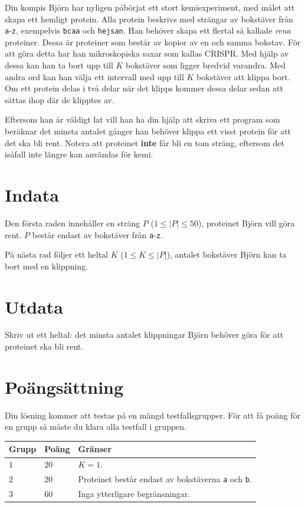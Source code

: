 \noindent

Din kompis Björn har nyligen påbörjat ett stort kemiexperiment, med målet att skapa
ett hemligt protein. Alla protein beskrivs med strängar av bokstäver från
\texttt{a}-\texttt{z}, exempelvis \texttt{bcaa} och \texttt{hejsan}. Han behöver skapa
ett flertal så kallade \textit{rena} proteiner. Dessa är proteiner som består av kopior
av en och samma bokstav. För att göra detta har han mikroskopiska saxar som kallas CRISPR.
Med hjälp av dessa kan han ta bort upp till $K$ bokstäver som ligger bredvid varandra.
Med andra ord kan han välja ett intervall med upp till $K$ bokstäver att klippa bort.
Om ett protein delas i två delar när det klipps kommer dessa delar sedan att sättas ihop där de klipptes av. 

Eftersom han är väldigt lat vill han ha din hjälp att skriva ett program som beräknar
det minsta antalet gånger han behöver klippa ett visst protein för att det ska bli rent.
Notera att proteinet \textbf{inte} får bli en tom sträng, eftersom det isåfall inte
längre kan användas för kemi.


\section*{Indata}
Den första raden innehåller en sträng $P$ ($1 \leq |P| \leq 50$), proteinet Björn vill göra rent.
$P$ består endast av bokstäver från \texttt{a}-\texttt{z}.

På nästa rad följer ett heltal $K$ ($1 \leq K \leq |P|$), antalet bokstäver Björn kan ta bort med en klippning. 

\section*{Utdata}
Skriv ut ett heltal: det minsta antalet klippningar Björn behöver göra för att proteinet ska bli rent.


\section*{Poängsättning}
Din lösning kommer att testas på en mängd testfallsgrupper.
För att få poäng för en grupp så måste du klara alla testfall i gruppen.

\noindent
\begin{tabular}{| l | l | p{12cm} |}
  \hline
  \textbf{Grupp} & \textbf{Poäng} & \textbf{Gränser} \\ \hline
  $1$    & $20$       & $K = 1$. \\ \hline
  $2$    & $20$       & Proteinet består endast av bokstäverna \texttt{a} och \texttt{b}. \\ \hline
  $3$    & $60$       & Inga ytterligare begränsningar. \\ \hline
\end{tabular}

